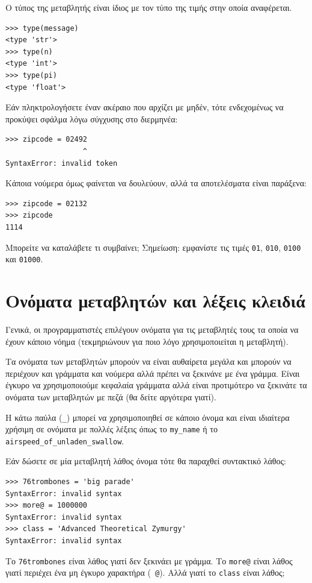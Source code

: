 \documentclass[10pt]{book}
\begin{document}
Ο τύπος της μεταβλητής είναι ίδιος με τον τύπο της τιμής στην οποία αναφέρεται.

\begin{verbatim}
>>> type(message)
<type 'str'>
>>> type(n)
<type 'int'>
>>> type(pi)
<type 'float'>
\end{verbatim}
\vfill
\begin{exercise}

Εάν πληκτρολογήσετε έναν ακέραιο που αρχίζει με μηδέν, τότε ενδεχομένως
να προκύψει σφάλμα λόγω σύγχυσης στο διερμηνέα:

\begin{verbatim}
>>> zipcode = 02492
                  ^
SyntaxError: invalid token
\end{verbatim}

Κάποια νούμερα όμως φαίνεται να δουλεύουν, αλλά τα αποτελέσματα είναι παράξενα:

\begin{verbatim}
>>> zipcode = 02132
>>> zipcode
1114
\end{verbatim}

Μπορείτε να καταλάβετε τι συμβαίνει; Σημείωση: εμφανίστε τις
τιμές {\tt 01}, {\tt 010}, {\tt 0100} και {\tt 01000}.
\end{exercise}



\section{Ονόματα μεταβλητών και λέξεις κλειδιά}

Γενικά, οι προγραμματιστές επιλέγουν ονόματα για τις μεταβλητές τους
τα οποία να έχουν κάποιο νόημα (τεκμηριώνουν για ποιο λόγο χρησιμοποιείται
η μεταβλητή).

Τα ονόματα των μεταβλητών μπορούν να είναι αυθαίρετα μεγάλα και 
μπορούν να περιέχουν και γράμματα και νούμερα αλλά πρέπει να
ξεκινάνε με ένα γράμμα.  Είναι έγκυρο να χρησιμοποιούμε κεφαλαία
γράμματα αλλά είναι προτιμότερο να ξεκινάτε τα ονόματα των μεταβλητών
με πεζά (θα δείτε αργότερα γιατί).

Η κάτω παύλα (\verb"_") μπορεί να χρησιμοποιηθεί σε κάποιο όνομα και 
είναι ιδιαίτερα χρήσιμη σε ονόματα με πολλές λέξεις όπως το 
\verb"my_name" ή το \verb"airspeed_of_unladen_swallow".


Εάν δώσετε σε μία μεταβλητή λάθος όνομα τότε θα παραχθεί συντακτικό λάθος:

\begin{verbatim}
>>> 76trombones = 'big parade'
SyntaxError: invalid syntax
>>> more@ = 1000000
SyntaxError: invalid syntax
>>> class = 'Advanced Theoretical Zymurgy'
SyntaxError: invalid syntax
\end{verbatim}
%
Το {\tt 76trombones} είναι λάθος γιατί δεν ξεκινάει με γράμμα.  
Το {\tt more@} είναι λάθος γιατί περιέχει ένα μη έγκυρο χαρακτήρα ({\tt
@}). Αλλά γιατί το {\tt class} είναι λάθος;
\end{document}
